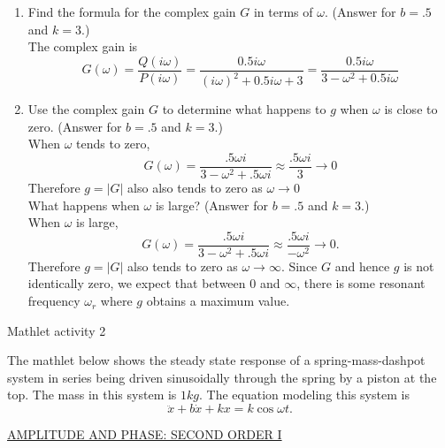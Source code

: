 \begin{enumerate}
\item Find the formula for the complex gain $G$ in terms of $\omega$.
  (Answer for $b=.5$ and $k=3$.) \\
  The complex gain is
  \begin{equation*}
    G(\omega) = \frac{Q(i \omega)}{P(i \omega)} = \frac{0.5i \omega}{(i \omega)^2 + 0.5 i \omega + 3}
    = \frac{0.5i \omega}{3 - \omega ^2  + 0.5 i \omega }
  \end{equation*}
\item Use the complex gain $G$ to determine what happens to
  $g$ when $\omega$ is close to zero. (Answer for $b=.5$ and $k=3$.) \\
  When $\omega$ tends to zero,
  \begin{equation*}
    G(\omega ) = \frac{.5\omega i}{3-\omega ^2+.5 \omega i}
    \approx \frac{.5\omega i}{3} \longrightarrow 0
  \end{equation*}
  Therefore $g = |G|$ also also tends to zero as $\omega \rightarrow 0$\\

  What happens when $\omega$ is large? (Answer for $b=.5$ and $k=3$.)\\
  When $\omega$ is large,
  \begin{equation*}
    G(\omega ) = \frac{.5\omega i}{3-\omega ^2+.5 \omega i}
    \approx \frac{.5\omega i}{-\omega ^2} \longrightarrow 0.
  \end{equation*}
  Therefore $g=|G|$ also tends to zero as $\omega \rightarrow \infty$.
  Since $G$ and hence $g$ is not identically zero, we expect that between $0$ and $\infty$,
  there is some resonant frequency $\omega _r$ where $g$ obtains a maximum value.   
\end{enumerate}

\begin{exercise}
  Mathlet activity 2
\end{exercise}

The mathlet below shows the steady state response of
a spring-mass-dashpot system in series being driven
sinusoidally through the spring by a piston at the top.
The mass in this system is $1kg$. The equation modeling this system is
\begin{equation*}
  \ddot x + b\dot x + k x = k \cos \omega t.
\end{equation*}

\href{http://mathlets.org/mathlets/amplitude-and-phase-2nd-order/}
{AMPLITUDE AND PHASE: SECOND ORDER I}

